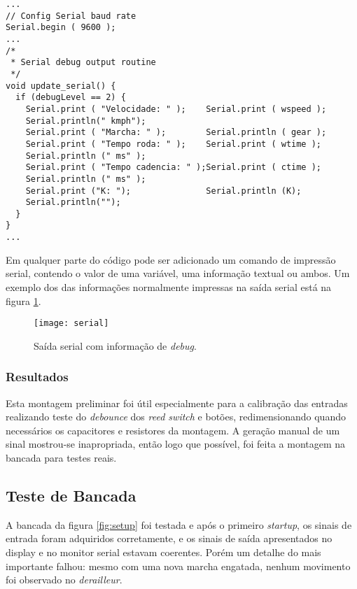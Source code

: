 \documentclass[a4paper,11pt]{article}
\begin{document}
\begin{lstlisting}
...
// Config Serial baud rate
Serial.begin ( 9600 );
...
/*
 * Serial debug output routine
 */
void update_serial() {
  if (debugLevel == 2) {
    Serial.print ( "Velocidade: " );    Serial.print ( wspeed );
    Serial.println(" kmph");
    Serial.print ( "Marcha: " );        Serial.println ( gear );
    Serial.print ( "Tempo roda: " );    Serial.print ( wtime );
    Serial.println (" ms" );
    Serial.print ( "Tempo cadencia: " );Serial.print ( ctime );
    Serial.println (" ms" );
    Serial.print ("K: ");               Serial.println (K);
    Serial.println("");
  }
}
...
\end{lstlisting}

Em qualquer parte do código pode ser adicionado um comando de impressão serial,
contendo o valor de uma variável, uma informação textual ou ambos. Um exemplo
dos das informações normalmente impressas na saída serial está na figura
\ref{fig:serial}.

\begin{figure}[h!]
\begin{center}
 \texttt{[image: serial]}
\end{center}
  \caption{Saída serial com informação de \textit{debug}.}
  \label{fig:serial}
\end{figure}





\subsubsection{Resultados}

Esta montagem preliminar foi útil especialmente para a calibração das entradas
realizando teste do \textit{debounce} dos \textit{reed switch} e botões,
redimensionando quando necessários os capacitores e resistores da montagem. A
geração manual de um sinal mostrou-se inapropriada, então logo que possível,
foi feita a montagem na bancada para testes reais.

\subsection{Teste de Bancada}

A bancada da figura \ref{fig:setup} foi testada e após o primeiro
\textit{startup}, os sinais de entrada foram adquiridos corretamente, e os
sinais de saída apresentados no display e no monitor serial estavam coerentes.
Porém um detalhe do mais importante falhou: mesmo com uma nova marcha engatada,
nenhum movimento foi observado no \textit{derailleur}.
\end{document}
